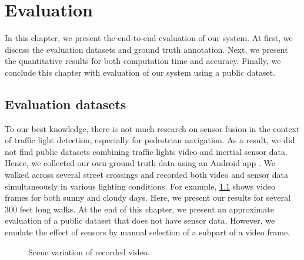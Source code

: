 \chapter{Evaluation}
\label{c:evalu}

In this chapter, we present the end-to-end evaluation of our system.
At first, we discuss the evaluation datasets and ground truth annotation.
Next, we present the quantitative results for both computation time and accuracy.
Finally, we conclude this chapter with evaluation of our system using a public dataset.

\section{Evaluation datasets}
\label{s:eval}
To our best knowledge, there is not much research on sensor fusion in the context of traffic light detection, especially for pedestrian navigation. 
As a result, we did not find public datasets combining traffic lights video and inertial sensor data. 
Hence, we collected our own ground truth data using an Android app .
We walked across several street crossings and recorded both video and sensor data simultaneously in various lighting conditions. 
For example, \ref{f:dataset} shows video frames for both sunny and cloudy days. 
Here, we present our results for several 300 feet long walks.  
At the end of this chapter, we present an approximate evaluation of a public dataset that does not have sensor data. 
However, we emulate the effect of sensors by manual selection of a subpart of a video frame. 

\begin{figure}[!ht]
\centering
{}
\hfill
{}
\caption{Scene variation of recorded video.}
\label{f:dataset}
\end{figure}


